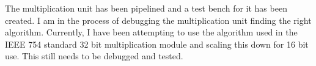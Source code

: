 The multiplication unit has been pipelined and a test bench for it has been created. I am in the process of debugging the multiplication unit finding the right algorithm. Currently, I have been attempting to use the algorithm used in the IEEE 754 standard 32 bit multiplication module and scaling this down for 16 bit use. This still needs to be debugged and tested. 